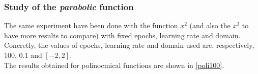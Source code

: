 \documentclass[a4paper, 11pt]{article}
\begin{document}
\subsubsection{Study of the \textit{parabolic} function}
The same experiment have been done with the function $x^2$ (and also the $x^3$ to have more results to compare) with fixed epochs, learning rate and domain.\\
Concretly, the values of epochs, learning rate and domain used are, respectively, $100$, $0.1$ and $[-2,2]$.\\
The results obtained for polinocmical functions are shown in \ref{poli100}.
\begin{figure}[h!]
    \centering
     \hspace{0.5em}
     \hspace{0.5em}

\end{figure}
\end{document}
